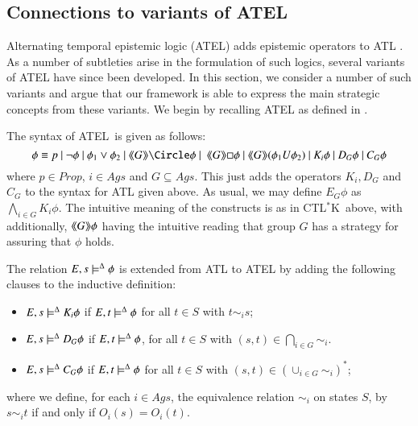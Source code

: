 \documentclass[a4wide]{article}
\newcommand{\ATEL}{ATEL}
\newcommand{\CTLsK}{\mbox{CTL$^*$K}}
\newcommand{\until}{U}
\newcommand{\Prop}{Prop}
\theoremstyle{examplesty}
\newcommand{\Ags}{\mathit{Ags}}
\newcommand{\atlop}[1]{\langle\hspace{-2pt}\langle #1 \rangle \hspace{-2pt}\rangle }
\newcommand{\Env}{E}
\newcommand{\nxt}{\Circle}
\newcommand{\always}{\Box}
\begin{document}
\subsection{Connections to variants of ATEL} \label{sec:atelvarn}
 

Alternating temporal epistemic logic (ATEL)
adds 
epistemic operators to ATL \cite{ATEL}. 
As a number of subtleties arise in the formulation of such logics, several variants of ATEL have since
been developed. In this section, we consider a number of such variants 
and argue that our framework is able to express the main strategic concepts 
from these variants. We begin by recalling ATEL as defined in \cite{ATEL}.




The syntax of \ATEL\ is given as follows: 
$$\phi \equiv p ~|~\neg \phi~|~\phi_1 \lor \phi_2~|~\atlop{G}\nxt\phi ~|~~\atlop{G}\always\phi ~|~\atlop{G}(\phi_1 \until \phi_2) ~|~K_i\phi~|~D_G\phi~| ~C_G\phi
$$
where $p \in \Prop$, $i \in \Ags$ and $G\subseteq \Ags$. 
This just adds the operators $K_i, D_G$ and $C_G$ to the syntax for ATL given above. 
As usual, we may define $E_G\phi$ as $\bigwedge_{i\in G} K_i \phi$. 
 The intuitive meaning of the constructs is as in \CTLsK\ above, with additionally, 
$\atlop{G}\phi$ having the intuitive reading that group $G$ has a strategy for assuring that $\phi$ holds. 






The relation $\Env,s\models^\GStrats \phi$ is extended from ATL to ATEL by adding the following 
clauses to the inductive definition: 
\begin{itemize}

\item
$\Env,s\models^\GStrats K_i\phi$ if  $\Env,t \models^\GStrats \phi$
 for all $t\in S$ with $t\sim_i s$; 


\item
$\Env,s\models^\GStrats D_G\phi$ if  $\Env,t \models^\GStrats \phi$, for all $t\in S$ with $(s,t) \in  \bigcap_{i\in G}\sim_i$.

\item
$\Env,s\models^\GStrats C_G\phi$ if  $\Env,t \models^\GStrats \phi$
for  all $t\in S$ with $(s,t) \in (\cup_{i\in G} \sim_i)^*$; 
\end{itemize}
where we define, for each $i \in \Ags$, the equivalence relation $\sim_i$ on states $S$, 
by $s\sim_i t$ if and only if $O_i(s)=O_i(t)$. 


\newcommand{\detc}{\mathit{det}}  
\end{document}
